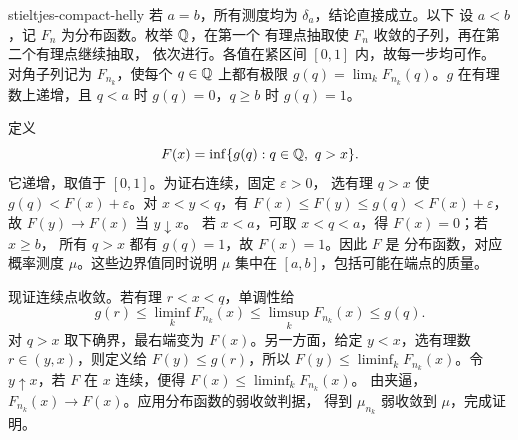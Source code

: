 \begin{solution}{stieltjes-compact-helly}
若 \(a=b\)，所有测度均为 \(\delta_a\)，结论直接成立。以下
设 \(a<b\)，记 \(F_n\) 为分布函数。枚举 \(\mathbb{Q}\)，在第一个
有理点抽取使 \(F_n\) 收敛的子列，再在第二个有理点继续抽取，
依次进行。各值在紧区间 \([0,1]\) 内，故每一步均可作。
对角子列记为 \(F_{n_k}\)，使每个 \(q\in\mathbb{Q}\) 上都有极限
\(g(q)=\lim_kF_{n_k}(q)\)。\(g\) 在有理数上递增，且
\(q<a\) 时 \(g(q)=0\)，\(q\ge b\) 时 \(g(q)=1\)。

定义
\[
 F(x)=\inf\{g(q):q\in\Q,\ q>x\}.
\]
它递增，取值于 \([0,1]\)。为证右连续，固定 \(\varepsilon>0\)，
选有理 \(q>x\) 使 \(g(q)<F(x)+\varepsilon\)。对
\(x<y<q\)，有 \(F(x)\le F(y)\le g(q)<F(x)+\varepsilon\)，
故 \(F(y)\to F(x)\) 当 \(y\downarrow x\)。
若 \(x<a\)，可取 \(x<q<a\)，得 \(F(x)=0\)；若 \(x\ge b\)，
所有 \(q>x\) 都有 \(g(q)=1\)，故 \(F(x)=1\)。因此 \(F\) 是
分布函数，对应概率测度 \(\mu\)。这些边界值同时说明 \(\mu\)
集中在 \([a,b]\)，包括可能在端点的质量。

现证连续点收敛。若有理 \(r<x<q\)，单调性给
\[
 g(r)\le\liminf_kF_{n_k}(x)
 \le\limsup_kF_{n_k}(x)\le g(q).
\]
对 \(q>x\) 取下确界，最右端变为 \(F(x)\)。另一方面，给定
\(y<x\)，选有理数 \(r\in(y,x)\)，则定义给
\(F(y)\le g(r)\)，所以
\(F(y)\le\liminf_kF_{n_k}(x)\)。令 \(y\uparrow x\)，若 \(F\)
在 \(x\) 连续，便得 \(F(x)\le\liminf_kF_{n_k}(x)\)。
由夹逼，\(F_{n_k}(x)\to F(x)\)。应用分布函数的弱收敛判据，
得到 \(\mu_{n_k}\) 弱收敛到 \(\mu\)，完成证明。
\end{solution}
